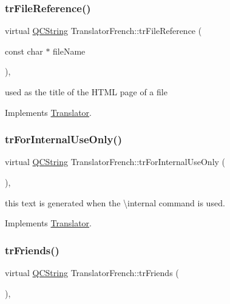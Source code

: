 \subsubsection{\texorpdfstring{trFileReference()}{trFileReference()}}
{\footnotesize\ttfamily virtual \mbox{\hyperlink{class_q_c_string}{Q\+C\+String}} Translator\+French\+::tr\+File\+Reference (\begin{DoxyParamCaption}\item[{const char $\ast$}]{file\+Name }\end{DoxyParamCaption})\hspace{0.3cm}{\ttfamily [inline]}, {\ttfamily [virtual]}}

used as the title of the H\+T\+ML page of a file 

Implements \mbox{\hyperlink{class_translator}{Translator}}.

\mbox{\label{class_translator_french_a096994c5d68662e76bf68e3a4fe5558a}} 
\subsubsection{\texorpdfstring{trForInternalUseOnly()}{trForInternalUseOnly()}}
{\footnotesize\ttfamily virtual \mbox{\hyperlink{class_q_c_string}{Q\+C\+String}} Translator\+French\+::tr\+For\+Internal\+Use\+Only (\begin{DoxyParamCaption}{ }\end{DoxyParamCaption})\hspace{0.3cm}{\ttfamily [inline]}, {\ttfamily [virtual]}}

this text is generated when the \textbackslash{}internal command is used. 

Implements \mbox{\hyperlink{class_translator}{Translator}}.

\mbox{\label{class_translator_french_a5921a7862b0853335f26b8fd8ec2726b}} 
\subsubsection{\texorpdfstring{trFriends()}{trFriends()}}
{\footnotesize\ttfamily virtual \mbox{\hyperlink{class_q_c_string}{Q\+C\+String}} Translator\+French\+::tr\+Friends (\begin{DoxyParamCaption}{ }\end{DoxyParamCaption})\hspace{0.3cm}{\ttfamily [inline]}, {\ttfamily [virtual]}}


